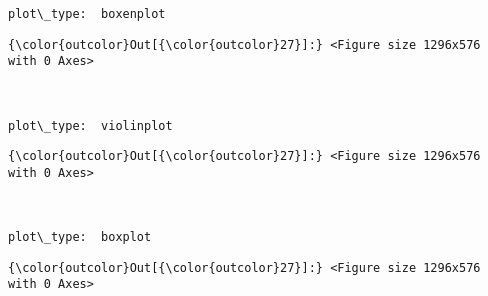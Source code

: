 \documentclass[11pt]{article}
\begin{document}
    \begin{Verbatim}[commandchars=\\\{\}]
plot\_type:  boxenplot

    \end{Verbatim}

\begin{Verbatim}[commandchars=\\\{\}]
{\color{outcolor}Out[{\color{outcolor}27}]:} <Figure size 1296x576 with 0 Axes>
\end{Verbatim}
            
    \begin{center}
    \end{center}
    { \hspace*{\fill} \\}
    
    \begin{Verbatim}[commandchars=\\\{\}]
plot\_type:  violinplot

    \end{Verbatim}

\begin{Verbatim}[commandchars=\\\{\}]
{\color{outcolor}Out[{\color{outcolor}27}]:} <Figure size 1296x576 with 0 Axes>
\end{Verbatim}
            
    \begin{center}
    \end{center}
    { \hspace*{\fill} \\}
    
    \begin{Verbatim}[commandchars=\\\{\}]
plot\_type:  boxplot

    \end{Verbatim}

\begin{Verbatim}[commandchars=\\\{\}]
{\color{outcolor}Out[{\color{outcolor}27}]:} <Figure size 1296x576 with 0 Axes>
\end{Verbatim}
            
    \begin{center}
    \end{center}
    { \hspace*{\fill} \\}
    
\end{document}
